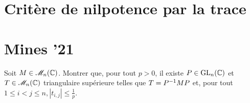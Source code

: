 \section{Critère de nilpotence par la trace} 


\section{Mines '21}
\begin{exercice}
    Soit $M \in \mathscr{M}_n(\mathbb{C})$. Montrer que, pour tout $p > 0$, il existe $P \in \mathrm{GL}_n(\mathbb{C})$ et $T \in \mathscr{M}_n(\mathbb{C})$ triangulaire supérieure telles que $T = P^{-1} M P$ et, pour tout $1 \leqslant i < j \leqslant n, |t_{i,j}| \leqslant \frac{1}{p}$.
\end{exercice}


